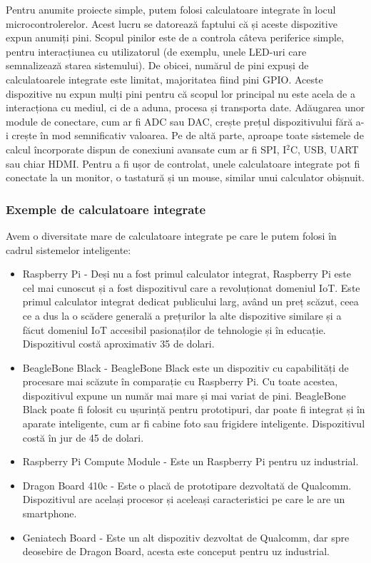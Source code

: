 Pentru anumite proiecte simple, putem folosi calculatoare integrate în locul
microcontrolerelor. Acest lucru se datorează faptului că și aceste dispozitive
expun anumiți pini. Scopul pinilor este de a controla câteva periferice simple,
pentru interacțiunea cu utilizatorul (de exemplu, unele LED-uri
 care semnalizează starea sistemului). De
obicei, numărul de pini expuși de calculatoarele integrate este limitat,
majoritatea fiind pini GPIO. Aceste dispozitive nu expun mulți pini
pentru că scopul lor principal nu este acela de a interacționa cu mediul, ci de
a aduna, procesa și transporta date. Adăugarea unor module de conectare, cum ar
fi ADC sau DAC, crește prețul dispozitivului fără a-i crește în mod semnificativ
valoarea. Pe de altă parte, aproape toate sistemele de calcul încorporate
dispun de conexiuni avansate cum ar fi SPI, I$^2$C, USB, UART sau chiar HDMI. Pentru
a fi ușor de controlat, unele calculatoare integrate pot fi conectate la un
monitor, o tastatură și un mouse, similar unui calculator obișnuit.

\subsubsection{Exemple de calculatoare integrate}
\label{sec:embed:micro-comp:embed:example}

Avem o diversitate mare de calculatoare integrate pe care le putem folosi în
cadrul sistemelor inteligente:

\begin{itemize}
	\item Raspberry Pi - Deși nu a fost primul calculator integrat,
		Raspberry Pi este cel mai cunoscut și a fost dispozitivul care a
		revoluționat domeniul IoT. Este primul calculator integrat
		dedicat publicului larg, având un preț scăzut, ceea ce a dus la
		o scădere generală a prețurilor la alte dispozitive similare și
		a făcut domeniul IoT accesibil pasionaților de tehnologie și în
		educație. Dispozitivul costă aproximativ 35 de dolari.
	\item BeagleBone Black - BeagleBone Black este un dispozitiv cu
		capabilități de procesare mai scăzute în comparație cu Raspberry
		Pi. Cu toate acestea, dispozitivul expune un număr mai mare și
		mai variat de pini. BeagleBone Black poate fi folosit cu
		ușurință pentru prototipuri, dar poate fi integrat și în aparate
		inteligente, cum ar fi cabine foto sau frigidere inteligente.
		Dispozitivul costă în jur de 45 de dolari.
	\item Raspberry Pi Compute Module - Este un Raspberry Pi pentru uz
		industrial.
	\item Dragon Board 410c - Este o placă de prototipare dezvoltată de
		Qualcomm. Dispozitivul are același procesor și aceleași
		caracteristici pe care le are un smartphone.
	\item Geniatech Board - Este un alt dispozitiv dezvoltat de Qualcomm,
		dar spre deosebire de Dragon Board, acesta este conceput pentru
		uz industrial.
\end{itemize}

